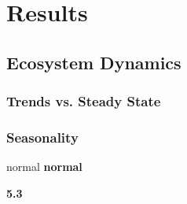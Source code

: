 \chapter{Results}
\label{chap:res}

\section{Ecosystem Dynamics}
\label{chap:res:dyn}

\subsection{Trends vs. Steady State}
\label{chap:res:dyn:trend}

\subsection{Seasonality}
\label{chap:res:dyn:seas}


normal \textbf{normal}

\textbf{5.3}

